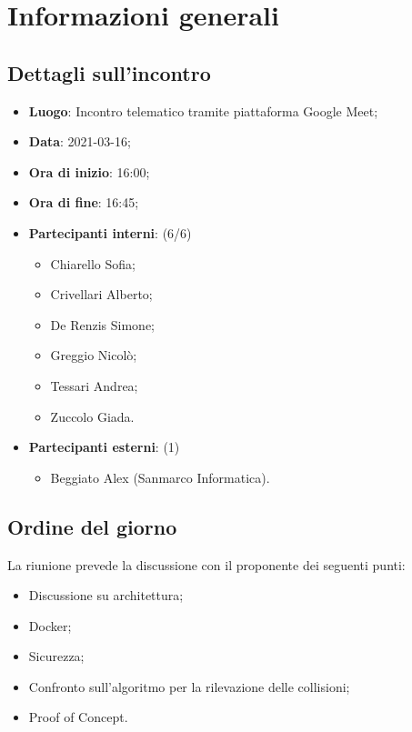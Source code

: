 \section{Informazioni generali}

\subsection{Dettagli sull'incontro}
\begin{itemize}
\item \textbf{Luogo}: Incontro telematico tramite piattaforma Google Meet;
\item \textbf{Data}: 2021-03-16;
\item \textbf{Ora di inizio}: 16:00;
\item \textbf{Ora di fine}: 16:45;
\item \textbf{Partecipanti interni}: (6/6)
\begin{itemize}
	\item Chiarello Sofia;
	\item Crivellari Alberto;
	\item De Renzis Simone;
	\item Greggio Nicolò;
	\item Tessari Andrea;
	\item Zuccolo Giada.
\end{itemize}
\item \textbf{Partecipanti esterni}: (1)
\begin{itemize}
	\item Beggiato Alex (Sanmarco Informatica).
\end{itemize}
\end{itemize}

\subsection{Ordine del giorno}

La riunione prevede la discussione con il proponente dei seguenti punti:
\begin{itemize}
	\item Discussione su architettura;
	\item Docker;
	\item Sicurezza;
	\item Confronto sull'algoritmo per la rilevazione delle collisioni;
	\item Proof of Concept.
\end{itemize}




